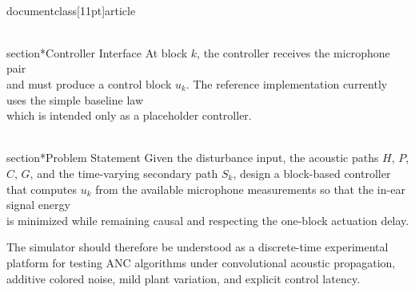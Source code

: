 \\documentclass[11pt]{article}
\begin{document}
\\section*{Controller Interface}
At block $k$, the controller receives the microphone pair
\\[
\left(m_k^{\mathrm{out}},\; m_k^{\mathrm{in}}\right)
\\]
and must produce a control block $u_k$. The reference implementation currently uses the simple baseline law
\\[
u_k = -m_k^{\mathrm{in}},
\\]
which is intended only as a placeholder controller.

\\section*{Problem Statement}
Given the disturbance input, the acoustic paths $H$, $P$, $C$, $G$, and the time-varying secondary path $S_k$, design a block-based controller that computes $u_k$ from the available microphone measurements so that the in-ear signal energy
\\[
\sum_k \lVert m_k^{\mathrm{in}} \rVert_2^2
\\]
is minimized while remaining causal and respecting the one-block actuation delay.

The simulator should therefore be understood as a discrete-time experimental platform for testing ANC algorithms under convolutional acoustic propagation, additive colored noise, mild plant variation, and explicit control latency.

\
\end{document}
